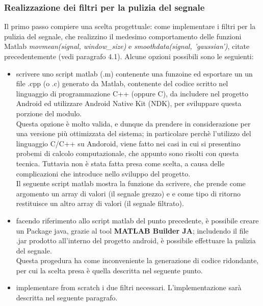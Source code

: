 \documentclass[a4paper]{article}
\begin{document}
\subsubsection{Realizzazione dei filtri per la pulizia del segnale}
Il primo passo compiere una scelta progettuale: come implementare i filtri per la pulizia del segnale, che realizzino il medesimo comportamento delle funzioni Matlab \textit{movmean(signal, window\_size)} e \textit{smoothdata(signal, 'gaussian')}, citate precedentemente (vedi paragrafo 4.1). Alcune opzioni possibili sono le seguienti: 
\begin{itemize}
\item {scrivere uno script matlab (.m) contenente una funzoine ed esportare un un file .cpp (o .c) generato da Matlab, contenente del codice scritto nel linguaggio di programmazione C++ (oppure C), da includere nel progetto Android ed utilizzare Android Native Kit (NDK), per sviluppare questa porzione del modulo. \\
Questa opzione è molto valida, e dunque da prendere in considerazione per una versione più ottimizzata del sistema; in particolare perchè l'utilizzo del linguaggio C/C++ su Andoroid, viene fatto nei casi in cui si presentino probemi di calcolo computazionale, che appunto sono risolti con questa tecnica. 
Tuttavia non è stata fatta presa come scelta, a causa delle complicazioni che introduce nello sviluppo del progetto.\\
Il seguente script matlab mostra la funzione da scrivere, che prende come argomento un array di valori (il segnale grezzo) e e come tipo di ritorno restituisce un altro array di valori (il segnale filtrato).\\
}
\item{facendo riferimento allo script matlab del punto precedente, è possibile creare un Package java, grazie al tool \textbf{MATLAB Builder JA}; includendo il file .jar prodotto all'interno del progetto android, è possibile effettuare la pulizia del segnale. \\
Questa progedura ha come inconveniente la generazione di codice ridondante, per cui la scelta presa è quella descritta nel seguente punto.}
\item{implementare from scratch i due filtri necessari. L'implementazione sarà descritta nel seguente paragrafo.}
\end{itemize}

\end{document}
